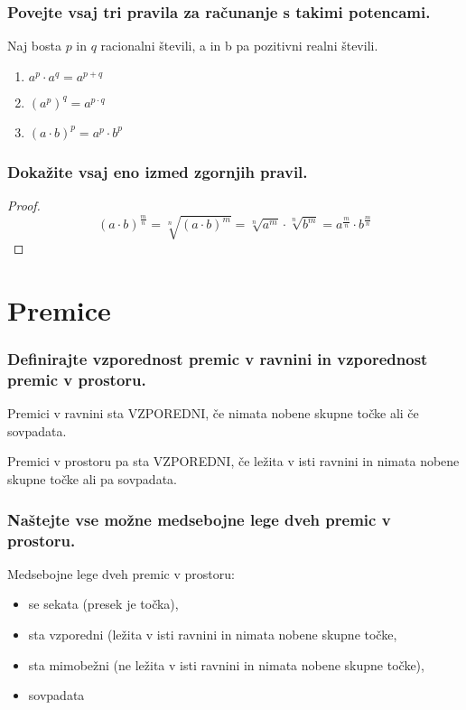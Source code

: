 \documentclass{article}
\begin{document}
\subsubsection*{Povejte vsaj tri pravila za računanje s takimi potencami.}

Naj bosta $p$ in $q$ racionalni števili, a in b pa pozitivni realni števili.
\begin{enumerate}
    \item $a^p \cdot a^q = a^{p+q}$
    \item $(a^p)^q = a^{p\cdot q}$
    \item $(a\cdot b)^p = a^p \cdot b^p$
\end{enumerate}

\subsubsection*{Dokažite vsaj eno izmed zgornjih pravil.}

\begin{proof}
    \begin{equation*}
        (a \cdot b)^{\frac{m}{n}} = \sqrt[n]{(a \cdot b)^m} = \sqrt[n]{a^m} \cdot \sqrt[n]{b^m} = a^{\frac{m}{n}} \cdot b^{\frac{m}{n}}
    \end{equation*}
\end{proof}

\section{Premice}
\subsubsection*{Definirajte vzporednost premic v ravnini in vzporednost premic v prostoru.}

Premici v ravnini sta VZPOREDNI, če nimata nobene skupne točke ali če sovpadata.

Premici v prostoru pa sta VZPOREDNI, če ležita v isti ravnini in nimata nobene skupne točke ali pa sovpadata.

\subsubsection*{Naštejte vse možne medsebojne lege dveh premic v prostoru.}

Medsebojne lege dveh premic v prostoru:
\begin{itemize}
    \item se sekata (presek je točka),
    \item sta vzporedni (ležita v isti ravnini in nimata nobene skupne točke,
    \item sta mimobežni (ne ležita v isti ravnini in nimata nobene skupne točke),
    \item sovpadata
\end{itemize}
\end{document}
